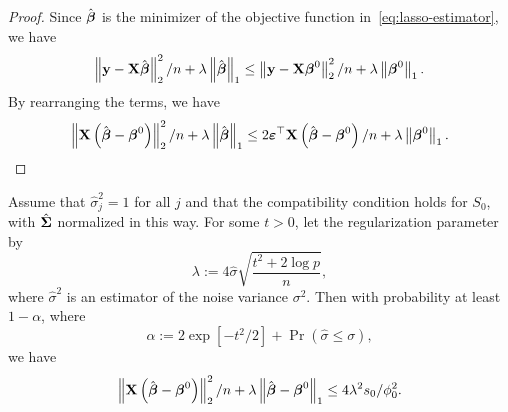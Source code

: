 \begin{proof}
	Since \(\hat{\boldsymbol{\beta}}\) is the minimizer of the objective function in~\eqref{eq:lasso-estimator}, we have
	\begin{equation*}
		\left\|\mathbf{y}-\mathbf{X}\hat{\boldsymbol{\beta}}\right\|_{2}^{2}/n+\lambda\left\|\hat{\boldsymbol{\beta}}\right\|_{1}\leq\left\|\mathbf{y}-\mathbf{X}\boldsymbol{\beta}^{0}\right\|_{2}^{2}/n+\lambda\left\|\boldsymbol{\beta}^{0}\right\|_{1}.
	\end{equation*}
	By rearranging the terms, we have
	\begin{equation*}
		\left\|\mathbf{X}\left(\hat{\boldsymbol{\beta}}-\boldsymbol{\beta}^{0}\right)\right\|_{2}^{2}/n+\lambda\left\|\hat{\boldsymbol{\beta}}\right\|_{1}\leq 2\boldsymbol{\varepsilon}^{\top}\mathbf{X}\left(\hat{\boldsymbol{\beta}}-\boldsymbol{\beta}^{0}\right)/n+\lambda\left\|\boldsymbol{\beta}^{0}\right\|_{1}.
	\end{equation*}
\end{proof}

\begin{corollary}
	Assume that \(\hat{\sigma}_j^{2}=1\) for all \(j\) and that the compatibility condition holds for \(S_{0}\), with \(\hat{\boldsymbol{\Sigma}}\) normalized in this way. For some \(t>0\), let the regularization parameter by
	\begin{equation*}
		\lambda:=4\hat{\sigma}\sqrt{\frac{t^{2}+2\log p}{n}},
	\end{equation*}
	where \(\hat{\sigma}^{2}\) is an estimator of the noise variance \(\sigma^{2}\). Then with probability at least \(1-\alpha\), where
	\begin{equation*}
		\alpha:=2\exp\left[-t^{2}/2\right]+\Pr(\hat{\sigma}\leq\sigma),
	\end{equation*}
	we have
	\begin{equation*}
		\left\|\mathbf{X}\left(\hat{\boldsymbol{\beta}}-\boldsymbol{\beta}^{0}\right)\right\|_{2}^{2}/n+\lambda\left\|\hat{\boldsymbol{\beta}}-\boldsymbol{\beta}^{0}\right\|_{1}\leq 4 \lambda^{2}s_{0}/\phi_{0}^{2}.
	\end{equation*}
\end{corollary}

